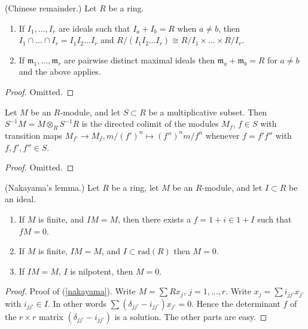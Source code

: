 \begin{lemma}
\label{lemma-chinese-remainder}
(Chinese remainder.)
Let $R$ be a ring.
\begin{enumerate}
\item If $I_1,\ldots,I_r$ are ideals such that $I_a + I_b = R$
when $a \not = b$, then $I_1 \cap \ldots \cap I_r = 
I_1I_2\ldots I_r$ and $R/(I_1I_2\ldots I_r)
\cong R/I_1 \times \ldots \times R/I_r$.
\item If $\mathfrak m_1,\ldots,\mathfrak m_r$ are pairwise distinct maximal
ideals then $\mathfrak m_a + \mathfrak m_b = R$ for $a \not=b$ and the
above applies.
\end{enumerate}
\end{lemma}

\begin{proof}
Omitted.
\end{proof}

\begin{lemma}
\label{lemma-localize-colimit}
Let $M$ be an $R$-module, and let $S \subset R$ be
a multiplicative subset. Then $S^{-1}M = M\otimes_R S^{-1}R$
is the directed colimit of the modules $M_f$, $f\in S$ with
transition maps $M_{f'} \to M_f, m/(f')^n \mapsto (f'')^n m/f^n$
whenever $f = f' f''$ with $f,f',f''\in S$.
\end{lemma}

\begin{proof}
Omitted.
\end{proof}

\begin{lemma}
\label{lemma-NAK}
(Nakayama's lemma.)
Let $R$ be a ring, let $M$ be an $R$-module, and let $I \subset R$
be an ideal.
\begin{enumerate}
\item If $M$ is finite, and $IM = M$, then there exists a
$f = 1+i \in 1 + I$ such that $fM = 0$.
\label{nakayama}
\item If $M$ is finite, $IM = M$, and $I \subset \text{rad}(R)$
then $M=0$.
\item If $IM=M$, $I$ is nilpotent, then $M=0$.
\end{enumerate}
\end{lemma}

\begin{proof}
Proof of (\ref{nakayama}).
Write $M = \sum Rx_j$, $j=1,\ldots,r$. Write $x_j = \sum i_{jj'} x_{j'}$ with
$i_{jj'} \in I$.  In other words $\sum (\delta_{jj'} - i_{jj'})x_{j'} = 0$.
Hence the determinant $f$ of the $r\times r$ matrix
$(\delta_{jj'} - i_{jj'})$ is a solution. The other parts are easy.
\end{proof}



